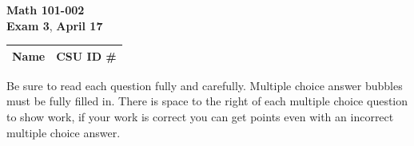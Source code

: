 \documentclass[12pt]{exam}
\newcommand{\class}{Math 101-002} %
\newcommand{\examnum}{Exam 3} %
\newcommand{\examdate}{April 17} %
\begin{document}
\pagestyle{plain}
\thispagestyle{empty}

\noindent
\textbf{\class}\\
\textbf{\examnum}, \textbf{\examdate} \\



\setlength{\tabcolsep}{3.5cm} %
\renewcommand{\arraystretch}{1.5}
\setlength\extrarowheight{1cm}
\begin{tabular}{ |c|c| } 
 \hline
 Name   & CSU ID \#  \\ 
 \hline
\end{tabular}
\vspace{10pt}

Be sure to read each question fully and carefully. Multiple choice answer bubbles must be fully filled in.  There is space to the right of each multiple choice question to show work, if your work is correct you can get points even with an incorrect multiple choice answer.  

\end{document}
